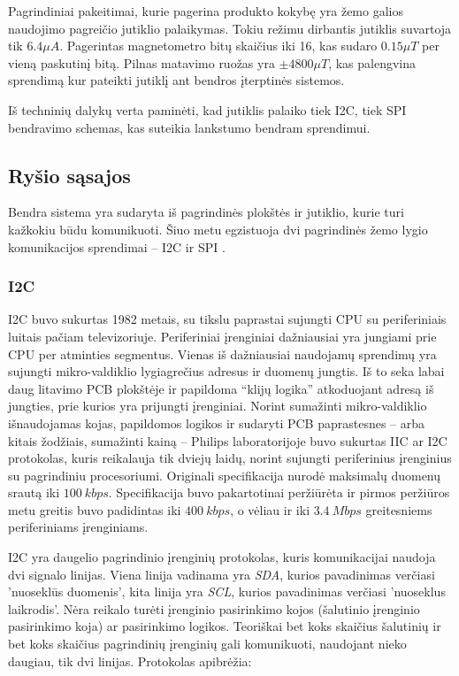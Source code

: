 Pagrindiniai pakeitimai, kurie pagerina produkto kokybę yra žemo galios naudojimo pagreičio jutiklio palaikymas.
Tokiu režimu dirbantis jutiklis suvartoja tik $6.4\mu A$.
Pagerintas magnetometro bitų skaičius iki 16, kas sudaro $0.15\mu T$ per vieną paskutinį bitą.
Pilnas matavimo ruožas yra $\pm4800\mu T$, kas palengvina sprendimą kur pateikti jutiklį ant bendros įterptinės sistemos.

Iš techninių dalykų verta paminėti, kad jutiklis palaiko tiek I2C, tiek SPI bendravimo schemas, kas suteikia lankstumo bendram sprendimui.

\subsection{Ryšio sąsajos}

Bendra sistema yra sudaryta iš pagrindinės plokštės ir jutiklio, kurie turi kažkokiu būdu komunikuoti. Šiuo metu egzistuoja dvi pagrindinės žemo lygio komunikacijos sprendimai -- I2C ir SPI \cite{Intro92:online}.

\subsubsection{I2C}

I2C buvo sukurtas 1982 metais, su tikslu paprastai sujungti CPU su periferiniais luitais pačiam televizoriuje.
Periferiniai įrenginiai dažniausiai yra jungiami prie CPU per atminties segmentus.
Vienas iš dažniausiai naudojamų sprendimų yra sujungti mikro-valdiklio lygiagrečius adresus ir duomenų jungtis.
Iš to seka labai daug litavimo PCB plokštėje ir papildoma ``klijų logika'' atkoduojant adresą iš jungties, prie kurios yra prijungti įrenginiai.
Norint sumažinti mikro-valdiklio išnaudojamas kojas, papildomos logikos ir sudaryti PCB paprastesnes -- arba kitais žodžiais, sumažinti kainą -- Philips laboratorijoje buvo sukurtas IIC ar I2C protokolas, kuris reikalauja tik dviejų laidų, norint sujungti periferinius įrenginius su pagrindiniu procesoriumi.
Originali specifikacija nurodė maksimalų duomenų srautą iki $100~kbps$.
Specifikacija buvo pakartotinai peržiūrėta ir pirmos peržiūros metu greitis buvo padidintas iki $400~kbps$, o vėliau ir iki $3.4~Mbps$ greitesniems periferiniams įrenginiams.

I2C yra daugelio pagrindinio įrenginių protokolas, kuris komunikacijai naudoja dvi signalo linijas.
Viena linija vadinama yra \textit{SDA}, kurios pavadinimas verčiasi 'nuoseklūs duomenis', kita linija yra \textit{SCL}, kurios pavadinimas verčiasi 'nuoseklus laikrodis'.
Nėra reikalo turėti įrenginio pasirinkimo kojos (šalutinio įrenginio pasirinkimo koja) ar pasirinkimo logikos.
Teoriškai bet koks skaičius šalutinių ir bet koks skaičius pagrindinių įrenginių gali komunikuoti, naudojant nieko daugiau, tik dvi linijas.
Protokolas apibrėžia:

